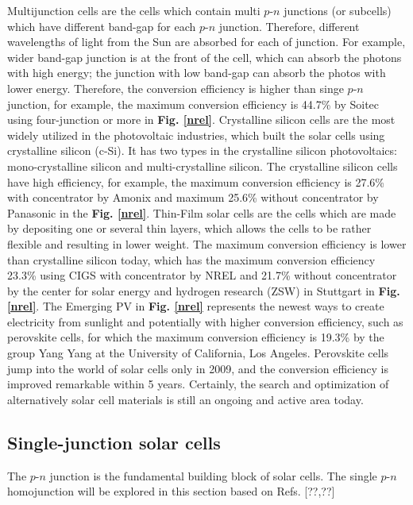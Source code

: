 \documentclass[a4paper, 12pt, titlepage,oneside,drop]{kthesis}
\begin{document}
Multijunction cells are the cells which contain multi $p$-$n$ junctions (or subcells) which have different band-gap for each $p$-$n$ junction.
Therefore, different wavelengths of light from the Sun are absorbed for each of junction. For example, wider band-gap junction is at the front of the cell, which can absorb the photons with high energy; the junction with 
low band-gap can absorb the photos with lower energy. Therefore, the conversion efficiency is higher than singe $p$-$n$ junction, for example, the maximum conversion efficiency is 44.7\% by Soitec using 
four-junction or more in \textbf{Fig. \ref{nrel}}. Crystalline silicon cells are the most widely utilized in the photovoltaic industries, which built the solar cells using crystalline silicon (c-Si). It has two types in
the crystalline silicon photovoltaics: mono-crystalline silicon and multi-crystalline silicon. The crystalline silicon cells have high efficiency, for example, the maximum conversion efficiency is 27.6\% with concentrator 
by Amonix and maximum 25.6\% without concentrator by Panasonic in  the \textbf{Fig. \ref{nrel}}. Thin-Film solar cells are the cells which are made by depositing one or several thin layers, which allows the cells to be rather 
flexible and resulting in lower weight. The maximum conversion efficiency is lower than crystalline silicon today, which has the maximum conversion efficiency 23.3\% using CIGS with concentrator by NREL and 21.7\% without 
concentrator by the center for solar energy and hydrogen research (ZSW) in Stuttgart in \textbf{Fig. \ref{nrel}}. The Emerging PV in \textbf{Fig. \ref{nrel}} represents the newest ways to create electricity from
sunlight and potentially with higher conversion efficiency, such as perovskite cells, for which the maximum conversion efficiency is 19.3\% by the group Yang Yang at the University of California, Los Angeles. 
Perovskite cells jump into the world of solar cells only in 2009, and the conversion efficiency is improved remarkable within 5 years. Certainly, the search and optimization 
of alternatively solar cell materials is still an ongoing and active area today.


\subsection{Single-junction solar cells}
The $p$-$n$ junction is the fundamental building block of solar cells. The single $p$-$n$ homojunction will be explored in this section based on Refs. [??,??]
\end{document}
